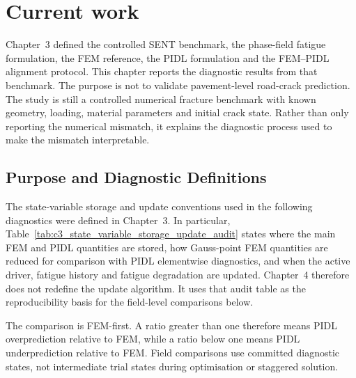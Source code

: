 
\ifpdf
    \graphicspath{{Chapter4/Figs/PDF/}{Chapter4/Figs/Raster/}{Chapter4/Figs/}}
\else
    \graphicspath{{Chapter4/Figs/Vector/}{Chapter4/Figs/}}
\fi

\chapter{Current work}
\label{ch:diagnostic_results_discussion}
\label{ch:diagnostic_results}

Chapter~3 defined the controlled SENT benchmark, the phase-field fatigue formulation, the FEM reference, the PIDL formulation and the FEM–PIDL alignment protocol. This chapter reports the diagnostic results from that benchmark. The purpose is not to validate pavement-level road-crack prediction. The study is still a controlled numerical fracture benchmark with known geometry, loading, material parameters and initial crack state. Rather than only reporting the numerical mismatch, it explains the diagnostic process used to make the mismatch interpretable.



\section{Purpose and Diagnostic Definitions}
\label{sec:c4_diagnostic_definitions}

The state-variable storage and update conventions used in the following diagnostics were defined in Chapter~3. In particular, Table~\ref{tab:c3_state_variable_storage_update_audit} states where the main FEM and PIDL quantities are stored, how Gauss-point FEM quantities are reduced for comparison with PIDL elementwise diagnostics, and when the active driver, fatigue history and fatigue degradation are updated. Chapter~4 therefore does not redefine the update algorithm. It uses that audit table as the reproducibility basis for the field-level comparisons below.

The comparison is FEM-first. A ratio greater than one therefore means PIDL overprediction relative to FEM, while a ratio below one means PIDL underprediction relative to FEM. Field comparisons use committed diagnostic states, not intermediate trial states during optimisation or staggered solution.


